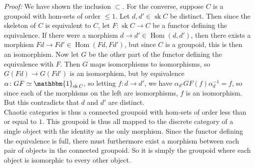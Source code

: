 \documentclass[a4paper]{article}
\DeclareMathOperator{\sk}{sk}
\DeclareMathOperator{\Hom}{Hom}
\begin{document}
    \linebreak
    \textit{Proof:} We have shown  the inclusion $\subset $. For the converse,
    suppose $C$ is a groupoid with hom-sets of order $\le 1$.
    Let $d, d' \in \sk C$ be distinct. Then since
    the skeleton of $C$ is equivalent to $C$, let $F  \colon \sk C \to C$ be
    a functor defining the equivalence. If there were a morphism
    $d \to d' \in \Hom (d,d')$, then
    there exists a morphism $Fd \to Fd' \in \Hom \left( Fd, Fd' \right) $, but
    since $C$ is a groupoid, this is then an isomorphism. Now let  $G$ be the
    other part of the functor defining the equivalence  with $F$. Then
    $G$ maps isomorphisms to isomorphisms, so
    $G \left( Fd \right) \to G\left( Fd' \right) $ is an isomorphism, but
    by equivalence $\alpha  \colon GF \simeq \mathbbm{1}_{\sk C}$, so
    letting  $f  \colon d \to d'$, we have
    $\alpha_{d'} GF(f) \alpha_{d}^{-1} = f$, so since each of the morphisms on
    the left are isomorphisms, $f$ is an isomorphism. But this contradicts
    that $d$ and $d'$ are distinct.\\
    \linebreak
    Chaotic categories is thus a connected groupoid with hom-sets of order less
    than or equal to $1$. This groupoid is thus all mapped to the discrete
    category of a single object
    with the identity as the only morphism. Since the functor
    defining the equivalence is full, there must furthermore exist a morphism
    between each pair of objects in the connected groupoid. So it is simply
    the groupoid where each object is isomorphic to every other object. 
    
\end{document}
